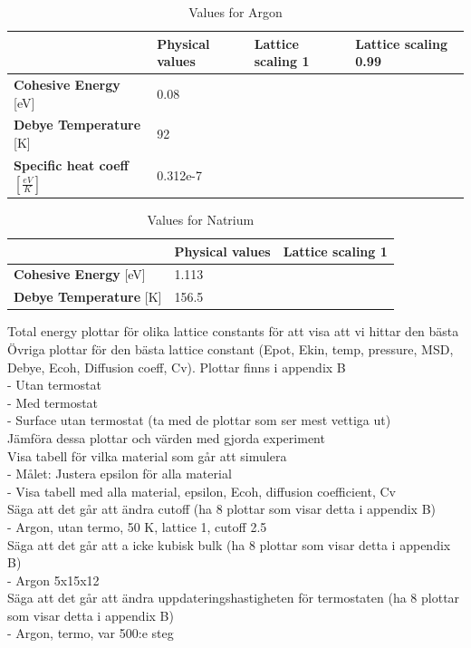 \documentclass[12pt,a4paper]{article}
\begin{document}
\begin{table}[h]
\caption{Values for Argon}
\begin{tabular}{| l | l | l | l |}
\hline
  & \textbf{Physical values} & \textbf{Lattice scaling 1} & \textbf{Lattice scaling 0.99} \\
\hline
\textbf{Cohesive Energy} [eV] & 0.08  &  &   \\
\hline
\textbf{Debye Temperature} [K] & 92 &  &  \\
\hline
\textbf{Specific heat coeff}  \( \left[ \frac{eV}{K}  \right] \) & 0.312e-7 &  & \\
\hline
\end{tabular}
\end{table}


\begin{table}[h]
\caption{Values for Natrium}
\begin{tabular}{| l | l | l |}
\hline
  & \textbf{Physical values} & \textbf{Lattice scaling 1} \\
\hline
\textbf{Cohesive Energy} [eV] & 1.113 &   \\
\hline
\textbf{Debye Temperature} [K] & 156.5 &   \\
\hline
\end{tabular}
\end{table} 



Total energy plottar för olika lattice constants för att visa att vi hittar den bästa\\
Övriga plottar för den bästa lattice constant (Epot, Ekin, temp, pressure, MSD, Debye, Ecoh, Diffusion coeff, Cv). Plottar finns i appendix B\\
	- Utan termostat\\
	- Med termostat\\
	- Surface utan termostat (ta med de plottar som ser mest vettiga ut)\\
Jämföra dessa plottar och värden med gjorda experiment\\
Visa tabell för vilka material som går att simulera\\
	- Målet: Justera epsilon för alla material\\
	- Visa tabell med alla material, epsilon, Ecoh, diffusion coefficient, Cv\\
Säga att det går att ändra cutoff (ha 8 plottar som visar detta i appendix B)\\
	- Argon, utan termo, 50 K, lattice 1, cutoff 2.5\\
Säga att det går att a icke kubisk bulk (ha 8 plottar som visar detta i appendix B)\\
	- Argon 5x15x12\\
Säga att det går att ändra uppdateringshastigheten för termostaten (ha 8 plottar som visar detta i appendix B)\\
	- Argon, termo, var 500:e steg\\
\end{document}
